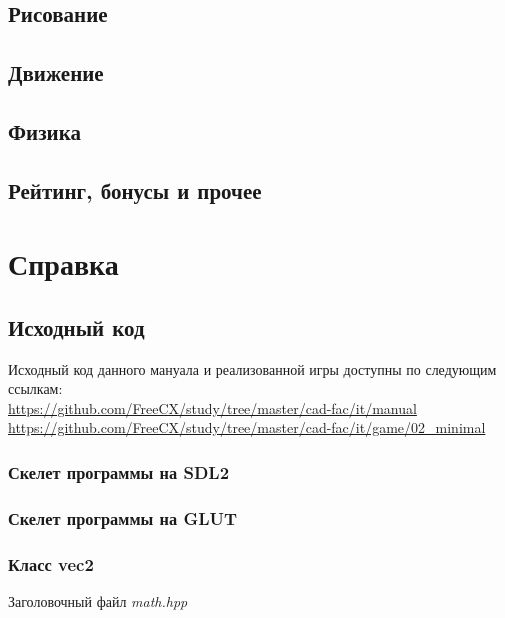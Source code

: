 \section{Рисование}
\section{Движение}
\section{Физика}
\section{Рейтинг, бонусы и прочее}

\chapter{Справка}

\section{Исходный код}
Исходный код данного мануала и реализованной игры доступны по следующим ссылкам:\\
\url{https://github.com/FreeCX/study/tree/master/cad-fac/it/manual}\\
\url{https://github.com/FreeCX/study/tree/master/cad-fac/it/game/02_minimal}

\subsection{Скелет программы на SDL2}
\label{code:skeletonSDL2}


\pagebreak

\subsection{Скелет программы на GLUT}
\label{code:skeletonGLUT}


\pagebreak

\subsection{Класс vec2}
\label{code:vec2}
\begin{center}
    Заголовочный файл \emph{math.hpp}
\end{center}


